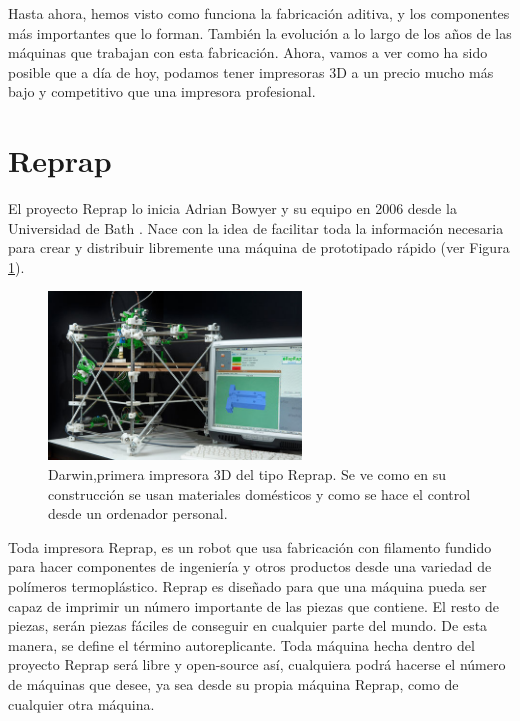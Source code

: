 Hasta ahora, hemos visto como funciona la fabricación aditiva, y los componentes más importantes que lo forman. También la evolución a lo largo de los años de las máquinas que trabajan con esta fabricación. Ahora, vamos a ver como ha sido posible que a día de hoy, podamos tener impresoras 3D a un precio mucho más bajo y competitivo que una impresora profesional.\\

\section{Reprap}
El proyecto Reprap lo inicia Adrian Bowyer y su equipo en 2006 desde la Universidad de Bath \cite{jones2011reprap}. Nace con la idea de facilitar toda la información necesaria para crear y distribuir libremente una máquina de prototipado rápido (ver Figura \ref{fig:estado_darwin}).

\begin{figure}[H]
    \centering
    \includegraphics[width=0.6\textwidth]{images/darwin.jpg}
    \caption[Darwin,primera impresora 3D del tipo Reprap]{Darwin,primera impresora 3D del tipo Reprap. Se ve como en su construcción se usan materiales domésticos y como se hace el control desde un ordenador personal.}
    \label{fig:estado_darwin}
\end{figure}

Toda impresora Reprap, es un robot que usa fabricación con filamento fundido para hacer componentes de ingeniería y otros productos desde una variedad de polímeros termoplástico. Reprap es diseñado para que una máquina pueda ser capaz de imprimir un número importante de las piezas que contiene. El resto de piezas, serán piezas fáciles de conseguir en cualquier parte del mundo. De esta manera, se define el término autoreplicante. Toda máquina hecha dentro del proyecto Reprap será libre y open-source así, cualquiera podrá hacerse el número de máquinas que desee, ya sea desde su propia máquina Reprap, como de cualquier otra máquina.\\

